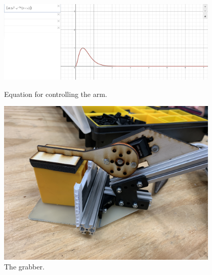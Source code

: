 \begin{figure}[ht]
\centering
\begin{minipage}[b]{.48\textwidth}
  \centering
  \includegraphics[width=0.95\textwidth]{Meetings/October/10-12-21/10-12-21_Team_Figure3 - Nathan Forrer.PNG}
  \caption{Equation for controlling the arm.}
  \label{fig:101221_3}
\end{minipage}%
\hfill%
\begin{minipage}[b]{.48\textwidth}
  \centering
  \includegraphics[width=0.95\textwidth]{Meetings/October/10-12-21/10-12-21_Team_Figure4 - Nathan Forrer.JPG}
  \caption{The grabber.}
  \label{fig:101221_4}
\end{minipage}
\end{figure}


